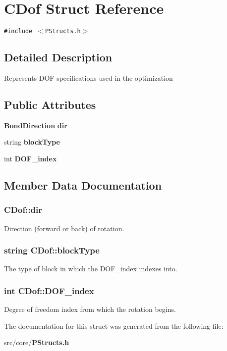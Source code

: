 \section{CDof Struct Reference}
\label{structCDof}
{\tt \#include $<$PStructs.h$>$}



\subsection{Detailed Description}
Represents DOF specifications used in the optimization 

\subsection*{Public Attributes}
\begin{CompactItemize}
\item 
{\bf Bond\-Direction} {\bf dir}
\item 
string {\bf block\-Type}
\item 
int {\bf DOF\_\-index}
\end{CompactItemize}


\subsection{Member Data Documentation}
\subsubsection{ {\bf CDof::dir}}\label{structCDof_93113cf7eb91b65bd99db115c67fe499}


Direction (forward or back) of rotation. 
\subsubsection{\setlength{\rightskip}{0pt plus 5cm}string {\bf CDof::block\-Type}}\label{structCDof_aeb44ad82d9d73a2b91f108cc9c4d72a}


The type of block in which the DOF\_\-index indexes into. 
\subsubsection{\setlength{\rightskip}{0pt plus 5cm}int {\bf CDof::DOF\_\-index}}\label{structCDof_f54e628dec79a0fc60da27a6b4783f1e}


Degree of freedom index from which the rotation begins. 

The documentation for this struct was generated from the following file:\begin{CompactItemize}
\item 
src/core/{\bf PStructs.h}\end{CompactItemize}
